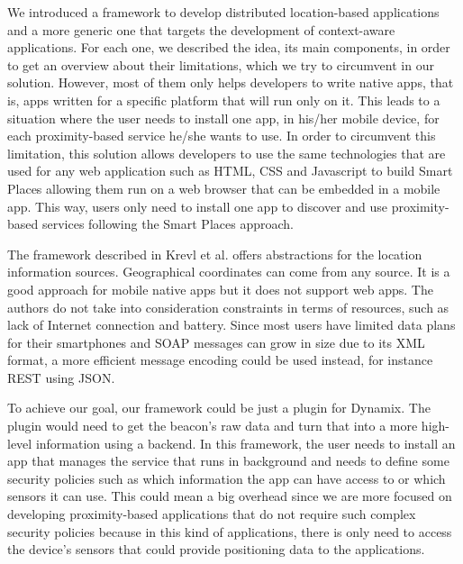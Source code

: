 We introduced a framework to develop distributed location-based applications and a more generic one that targets the development of context-aware applications.
For each one, we described the idea, its main components, in order to get an overview about their limitations, which we try to circumvent in our solution.
However, most of them only helps developers to write native apps, that is, apps written for a specific platform that will run only on it.
This leads to a situation where the user needs to install one app, in his/her mobile device, for each proximity-based service he/she wants to use.
In order to circumvent this limitation, this solution allows developers
to use the same technologies that are used for any web application such as \gls{HTML}, \gls{CSS} and Javascript to build Smart Places allowing them run on a web browser that can be embedded in a mobile app. This way, users only need to install one app to discover and use proximity-based services following the Smart Places approach.

The framework described in Krevl et al.\cite{Krevl2006} offers abstractions for the location information sources.
Geographical coordinates can
come from any source.
It is a good approach for
mobile native apps but it does not support web apps.
The authors do not take into consideration
constraints in terms of resources, such as
lack of Internet connection and battery.
Since most users have limited data plans for
their smartphones and \gls{SOAP} messages can
grow in size due to its \gls{XML} format,
a more efficient message encoding could be used
instead, for instance \gls{REST} using \gls{JSON}.

To achieve our goal, our framework could be just a
plugin for Dynamix. The plugin would
need to get the beacon's raw data and
turn that into a more high-level information
using a backend. In this framework,
the user needs to install an app that manages the service
that runs in background and needs to define some
security policies such as which information the app can have access to or which sensors it can use.
This could mean a big overhead since we are more focused on developing proximity-based applications that do not require such complex security policies because in this kind of applications, there is only need to access the device's sensors that could provide positioning data to the applications.
